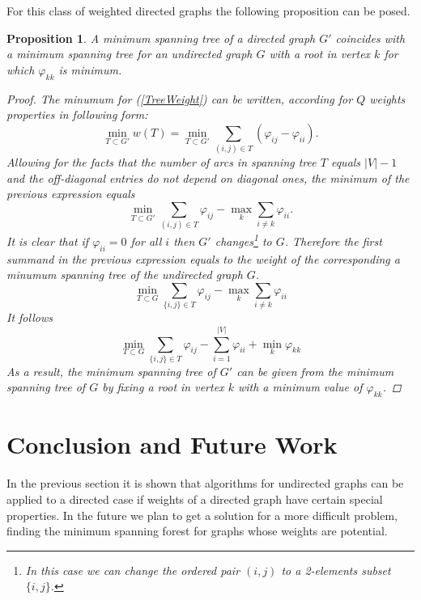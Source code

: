 \documentclass[10pt]{article}
\begin{document}
For this class of weighted directed graphs the following proposition can be
posed.
\newtheorem{teo}{Proposition}
\begin{teo}
A minimum spanning tree of a directed graph $G'$ coincides with a minimum
spanning tree for an undirected graph $G$ with a root in vertex $k$ for which
$\varphi_{kk}$ is minimum.
\begin{proof}
The minumum for (\ref{TreeWeight}) can be written, according for $Q$ weights
properties in following form:
\[
\min_{T \subset G'} w(T) =
\min_{T \subset G'} \sum_{(i,j) \in T} (\varphi_{ij} - \varphi_{ii}).
\]
Allowing for the facts that the number of arcs in spanning tree $T$
equals $|V|-1$ and the off-diagonal entries do not depend on 
diagonal ones, the minimum of the previous expression equals 
\[
\min_{T \subset G' } \sum_{(i,j) \in T} \varphi_{ij} - 
\max_{k} \sum_{i \neq k} \varphi_{ii}.
\]
It is clear that if $\varphi_{ii}=0$ for all $i$ then
$G'$ changes\footnote{
In this case we can change the ordered pair $(i,j)$ to a 2-elements
subset $\{i,j\}$.} to $G$.
Therefore the first summand in the previous expression equals to
the weight of the corresponding a minumum spanning tree of the undirected graph
$G$.
\[
\min_{T \subset G } \sum_{\{i,j\} \in T} \varphi_{ij} - 
\max_{k} \sum_{i \neq k} \varphi_{ii}
\]
It follows
\[
\min_{T \subset G } \sum_{\{i,j\} \in T} \varphi_{ij} - 
\sum_{i = 1}^{|V|} \varphi_{ii} + \min_{k} \varphi_{kk}
\]
As a result, the minimum spanning tree of $G'$ can be given from
the minimum spanning tree of $G$ by fixing a root in vertex $k$ with a minimum
value of $\varphi_{kk}$.
\end{proof}
\end{teo}

\section{Conclusion and Future Work}
In the previous section it is shown that algorithms for undirected graphs
can be applied to a directed case if weights of a directed graph have
certain special properties. In the future we plan to get a solution for a
more difficult problem, finding the minimum spanning forest for graphs
whose weights are potential.

   
 

\end{document}

